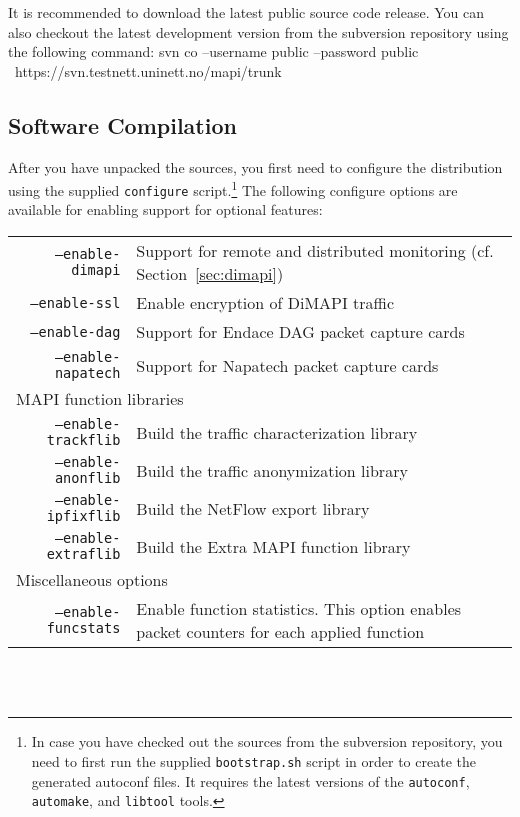 \documentclass[a4paper, 11pt]{article}
\newenvironment{code}{\small\verbatim}{\endverbatim}
\begin{document}
It is recommended to download the latest public source code release.
You can also checkout the latest development version from the subversion
repository using the following command:
\begin{code}
svn co --username public --password public \
        https://svn.testnett.uninett.no/mapi/trunk
\end{code}

\subsection{Software Compilation}

After you have unpacked the sources, you first need to
configure the distribution using the supplied {\tt configure}
script.\footnote{In case you have checked out the sources from the
subversion repository, you
need to first run the supplied {\tt bootstrap.sh} script in order to create
the generated autoconf files. It requires the latest versions of the
{\tt autoconf}, {\tt automake}, and {\tt libtool} tools.} 
The following configure options are available for enabling support for
optional features:

\renewcommand{\arraystretch}{1.6}
\begin{tabular}{rp{7cm}}
{\tt --enable-dimapi} & Support for remote and distributed monitoring (cf.
Section~\ref{sec:dimapi}) \\
{\tt --enable-ssl} & Enable encryption of DiMAPI traffic \\
{\tt --enable-dag} & Support for Endace DAG packet capture cards \\
{\tt --enable-napatech} & Support for Napatech packet capture cards \\
\multicolumn{2}{l}{MAPI function libraries} \\
{\tt --enable-trackflib} & Build the traffic characterization library \\
{\tt --enable-anonflib} & Build the traffic anonymization library \\
{\tt --enable-ipfixflib} & Build the NetFlow export library \\
{\tt --enable-extraflib} & Build the Extra MAPI function library \\
\multicolumn{2}{l}{Miscellaneous options} \\
{\tt --enable-funcstats} & Enable function statistics. This option enables packet
counters for each applied function \\
\end{tabular}
\renewcommand{\arraystretch}{1.0}
\\\\
\end{document}
